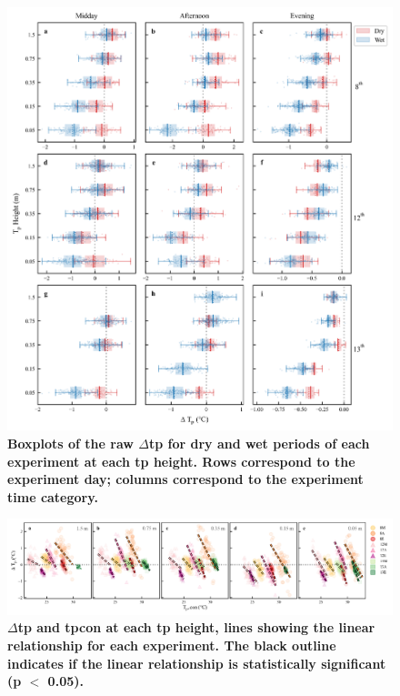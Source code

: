 \documentclass[final,3p,times,authoryear]{elsarticle}
\begin{document}
\begin{figure}
\centering
\includegraphics[trim={0 0 0 0},clip,scale=1.0]{pict038.png}
\caption{\bf Boxplots of the raw $\Delta$\gls{tp} for dry and wet periods of each experiment at each \gls{tp} height. Rows correspond to the experiment day; columns correspond to the experiment time category.}
 \label{fig:7.9}
\end{figure}


\begin{figure}
\centering
\includegraphics[trim={0 0 0 0},clip,scale=1.0]{pict039.png}
\caption{\bf $\Delta$\gls{tp} and \gls{tpcon} at each \gls{tp} height, lines showing the linear relationship for each experiment. The black outline indicates if the linear relationship is statistically significant (\gls{p} $<$ 0.05).}
 \label{fig:7.10}
\end{figure}
\end{document}
